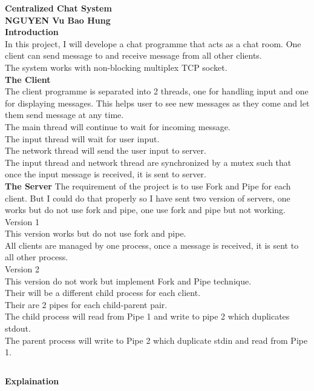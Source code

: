 \documentclass{article}
\begin{document}
\textbf{Centralized Chat System}\\
\textbf{NGUYEN Vu Bao Hung}\\
\textbf{Introduction}\\
In this project, I will develope a chat programme that acts as a chat room. One client can send message to and receive message from all other clients.\\
The system works with non-blocking multiplex TCP socket.\\
\textbf{The Client}\\
The client programme is separated into 2 threads, one for handling input and one for displaying messages. This helps user to see new messages as they come and let them send message at any time.\\
The main thread will continue to wait for incoming message.\\
The input thread will wait for user input.\\
The network thread will send the user input to server.\\
The input thread and network thread are synchronized by a mutex such that once the input message is received, it is sent to server.\\

\textbf{The Server}
The requirement of the project is to use Fork and Pipe for each client. But I could do that properly so I have sent two version of servers, one works but do not use fork and pipe, one use fork and pipe but not working.\\

Version 1\\
This version works but do not use fork and pipe.\\
All clients are managed by one process, once a message is received, it is sent to all other process.\\

Version 2\\
This version do not work but implement Fork and Pipe technique.\\
Their will be a different child process for each client.\\
Their are 2 pipes for each child-parent pair.\\
The child process will read from Pipe 1 and write to pipe 2 which duplicates stdout.\\
The parent process will write to Pipe 2 which duplicate stdin and read from Pipe 1.\\


\begin{lstlisting}

\end{lstlisting}

\textbf{Explaination}\\
\end{document}
